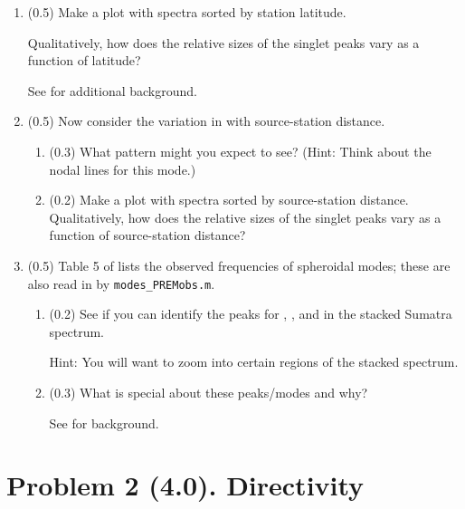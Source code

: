 \documentclass[11pt,titlepage,fleqn]{article}
\begin{document}
\begin{enumerate}

\item (0.5) Make a plot with   spectra sorted by station latitude.

Qualitatively, how does the relative sizes of the singlet peaks vary as a function of latitude?

See \citet[][Figure 3]{SSteinOkal2007} for additional background.


\item (0.5) Now consider the variation in  with source-station distance.
%
\begin{enumerate}
\item (0.3) What pattern might you expect to see? (Hint: Think about the nodal lines for this mode.)

\item (0.2) Make a plot with   spectra sorted by source-station distance. Qualitatively, how does the relative sizes of the singlet peaks vary as a function of source-station distance?
\end{enumerate}


\item (0.5) Table 5 of \citet{PREM} lists the observed frequencies of spheroidal modes; these are also read in by \verb+modes_PREMobs.m+.
%
\begin{enumerate}
\item (0.2) See if you can identify the peaks for , , and  in the stacked Sumatra spectrum.

Hint: You will want to zoom into certain regions of the stacked spectrum.

\item (0.3) What is special about these peaks/modes and why?

See \citet[][p. 106]{SteinWysession} for background.
\end{enumerate}

\end{enumerate}


\pagebreak
\section*{Problem 2 (4.0). Directivity}
\end{document}
